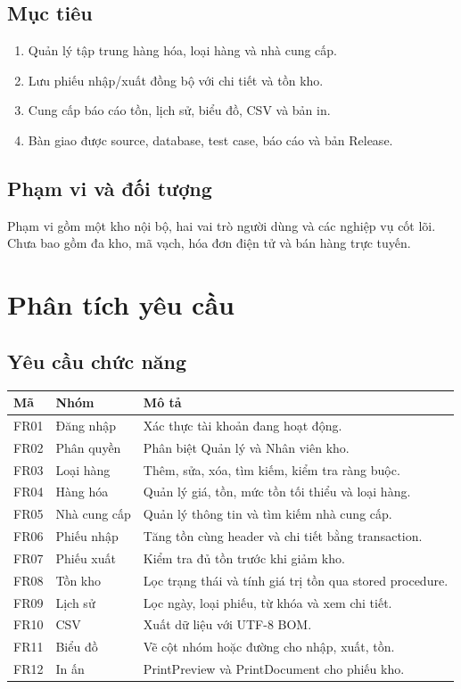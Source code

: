 \documentclass[12pt,a4paper]{report}
\begin{document}
\section{Mục tiêu}
\begin{enumerate}
\item Quản lý tập trung hàng hóa, loại hàng và nhà cung cấp.
\item Lưu phiếu nhập/xuất đồng bộ với chi tiết và tồn kho.
\item Cung cấp báo cáo tồn, lịch sử, biểu đồ, CSV và bản in.
\item Bàn giao được source, database, test case, báo cáo và bản Release.
\end{enumerate}
\section{Phạm vi và đối tượng}
Phạm vi gồm một kho nội bộ, hai vai trò người dùng và các nghiệp vụ cốt lõi.
Chưa bao gồm đa kho, mã vạch, hóa đơn điện tử và bán hàng trực tuyến.

\chapter{Phân tích yêu cầu}
\section{Yêu cầu chức năng}
\begin{longtable}{p{}p{}p{}}
\toprule Mã & Nhóm & Mô tả\\\midrule
FR01 & Đăng nhập & Xác thực tài khoản đang hoạt động.\\
FR02 & Phân quyền & Phân biệt Quản lý và Nhân viên kho.\\
FR03 & Loại hàng & Thêm, sửa, xóa, tìm kiếm, kiểm tra ràng buộc.\\
FR04 & Hàng hóa & Quản lý giá, tồn, mức tồn tối thiểu và loại hàng.\\
FR05 & Nhà cung cấp & Quản lý thông tin và tìm kiếm nhà cung cấp.\\
FR06 & Phiếu nhập & Tăng tồn cùng header và chi tiết bằng transaction.\\
FR07 & Phiếu xuất & Kiểm tra đủ tồn trước khi giảm kho.\\
FR08 & Tồn kho & Lọc trạng thái và tính giá trị tồn qua stored procedure.\\
FR09 & Lịch sử & Lọc ngày, loại phiếu, từ khóa và xem chi tiết.\\
FR10 & CSV & Xuất dữ liệu với UTF-8 BOM.\\
FR11 & Biểu đồ & Vẽ cột nhóm hoặc đường cho nhập, xuất, tồn.\\
FR12 & In ấn & PrintPreview và PrintDocument cho phiếu kho.\\
\bottomrule
\end{longtable}
\end{document}
